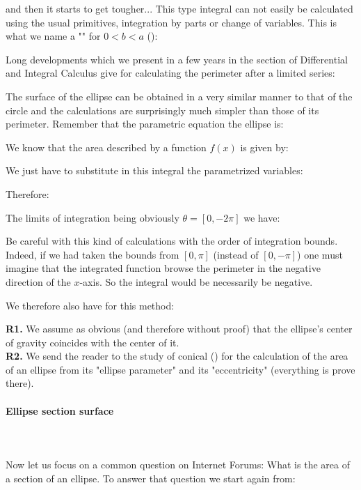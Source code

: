 {	and then it starts to get tougher... This type integral can not easily be calculated using the usual primitives, integration by parts or change of variables. This is what we name a "\label{elliptic integral ellipse perimeter}" for $0<b<a$ ():
	
	Long developments which we present in a few years in the section of Differential and Integral Calculus give for calculating the perimeter after a limited series:
	
	The surface of the ellipse can be obtained in a very similar manner to that of the circle and the calculations are surprisingly much simpler than those of its perimeter. Remember that the parametric equation the ellipse is:
	
	We know that the area described by a function $f(x)$ is given by:
	
	We just have to substitute in this integral the parametrized variables:
	
	Therefore:
	
	The limits of integration being obviously $\theta=[0,-2\pi]$ we have:
	
	\begin{tcolorbox}[title=Remark,colframe=black,arc=10pt]
	Be careful with this kind of calculations with the order of integration bounds. Indeed, if we had taken the bounds from $[0,\pi]$ (instead of $[0,-\pi]$) one must imagine that the integrated function browse the perimeter in the negative direction of the $x$-axis. So the integral would be necessarily be negative.
	\end{tcolorbox}
	We therefore also have for this method:
	
	\begin{tcolorbox}[title=Remarks,colframe=black,arc=10pt]
	\textbf{R1.} We assume as obvious (and therefore without proof) that the ellipse's center of gravity coincides with the center of it.\\
	
	\textbf{R2.} We send the reader to the study of conical () for the calculation of the area of an ellipse from its "ellipse parameter" and its "eccentricity" (everything is prove there).
	\end{tcolorbox}	
	
	\paragraph{Ellipse section surface}\mbox{}\\\\			
	Now let us focus on a common question on Internet Forums: What is the area of a section of an ellipse. To answer that question we start again from:
	
}
